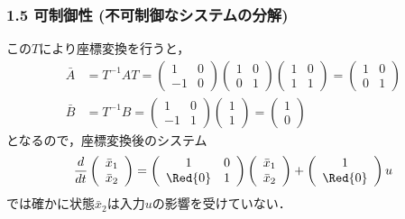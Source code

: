 \begin{frame}[t]
\frametitle{1.5 可制御性 (不可制御なシステムの分解)}
この$T$により座標変換を行うと，
\begin{align}
 \bar{A} &= T^{-1}AT =
 \left(
 \begin{array}{cc}
  1 & 0 \\
  -1 & 0
 \end{array}
 \right)
 \left(
 \begin{array}{cc}
  1 & 0 \\
  0 & 1
 \end{array}
 \right)
 \left(
 \begin{array}{cc}
  1 & 0 \\
  1 & 1
 \end{array}
 \right) =
 \left(
 \begin{array}{cc}
  1 & 0 \\
  0 & 1
 \end{array}
 \right) \\
 \bar{B} &= T^{-1}B =
 \left(
 \begin{array}{cc}
  1 & 0 \\
  -1 & 1
 \end{array}
 \right)
 \left(
 \begin{array}{c}
  1 \\
  1
 \end{array}
 \right) =
 \left(
 \begin{array}{c}
  1 \\
  0
 \end{array}
 \right)
\end{align}
となるので，座標変換後のシステム
\begin{equation}
 \frac{d}{dt}
  \left(
   \begin{array}{c}
    \bar{x}_1 \\
    \bar{x}_2
   \end{array}
  \right) =
  \left(
   \begin{array}{cc}
    1 & 0 \\
    \Red{0} & 1
   \end{array}
  \right)
  \left(
   \begin{array}{c}
    \bar{x}_1 \\
    \bar{x}_2
   \end{array}
  \right) +
  \left(
   \begin{array}{c}
    1 \\
    \Red{0}
   \end{array}
  \right) u
\end{equation}
では確かに状態$\bar{x}_2$は入力$u$の影響を受けていない．
\end{frame}


